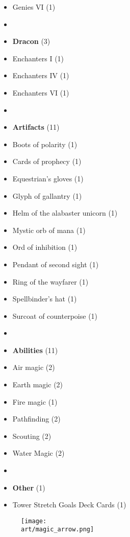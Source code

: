 \begin{multicols}{3}
\begin{itemize}[leftmargin=0pt, label={}, noitemsep, noitemsep]
  \item Genies VI (1)
  \item
  \item \textbf{Dracon} (3)
  \item Enchanters I (1)
  \item Enchanters IV (1)
  \item Enchanters VI (1)
  \item
  \item \textbf{Artifacts} (11)
  \item Boots of polarity (1)
  \item Cards of prophecy (1)
  \item Equestrian's gloves (1)
  \item Glyph of gallantry (1)
  \item Helm of the alabaster unicorn (1)
  \item Mystic orb of mana (1)
  \item Ord of inhibition (1)
  \item Pendant of second sight (1)
  \item Ring of the wayfarer (1)
  \item Spellbinder's hat (1)
  \item Surcoat of counterpoise (1)
  \item
  \item \textbf{Abilities} (11)
  \item Air magic (2)
  \item Earth magic (2)
  \item Fire magic (1)
  \item Pathfinding (2)
  \item Scouting (2)
  \item Water Magic (2)
  \item
  \item \textbf{Other} (1)
  \item Tower Stretch Goals Deck Cards (1)
\end{itemize}

\end{multicols}

\vfill
\begin{figure*}[!hb]
  \centering
  \texttt{[image: \\art/magic\_arrow.png]}
\end{figure*}
\vfill
